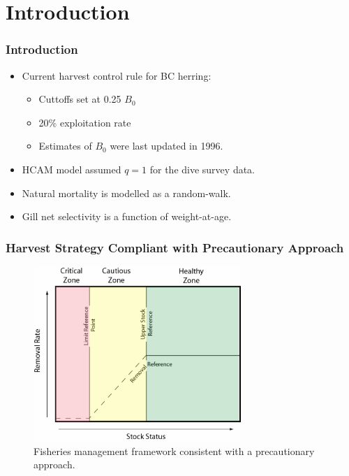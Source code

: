 \section{Introduction} %
\label{sec:introduction}
%
\begin{frame}
	\frametitle{Introduction}
	\begin{itemize}
		\item Current harvest control rule for BC herring:
		\begin{itemize}
			\item Cuttoffs set at 0.25 $B_0$
			\item 20\% exploitation rate
			\item Estimates of $B_0$ were last updated in 1996.
		\end{itemize}
		\item HCAM model assumed $q=1$ for the dive survey data.
		\item Natural mortality is modelled as a random-walk.
		\item Gill net selectivity is a function of weight-at-age.
	\end{itemize}
\end{frame}
%
\begin{frame}
	\frametitle{Harvest Strategy Compliant with Precautionary Approach}
	\begin{figure}[htbp]
		\centering
			\includegraphics[width=0.7\textwidth]{SSF}
		\caption{Fisheries management framework consistent with a precautionary approach.}
		\label{fig:label}
	\end{figure}
\end{frame}
%
